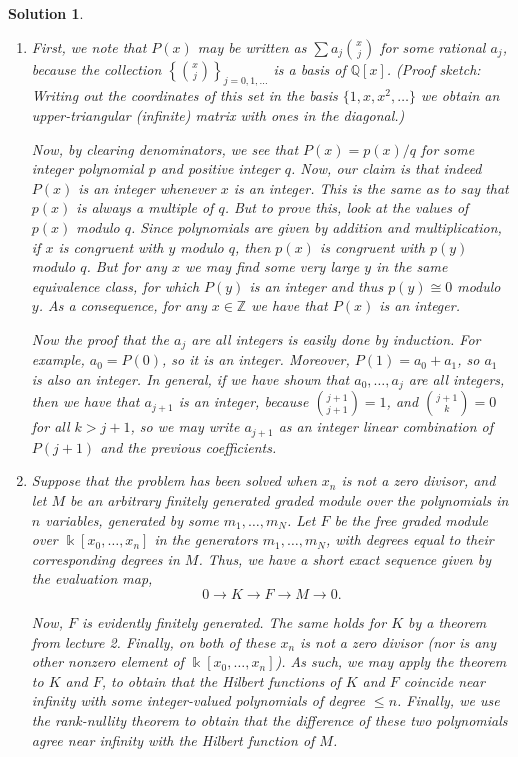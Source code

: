 \documentclass{article}
\theoremstyle{nonumberplain}
\newtheorem{sol}{Solution}
\newcommand{\Z}{\mathbb{Z}}
\newcommand{\Q}{\mathbb{Q}}
\newcommand{\kk}{\Bbbk}
\begin{document}
\begin{sol}
\begin{enumerate}
\item First, we note that $P(x)$ may be written as $\sum a_j \binom x j$ for some rational $a_j$, because the collection $\left\{\binom x j\right\}_{j = 0, 1, \dots}$ is a basis of $\Q[x]$. (Proof sketch: Writing out the coordinates of this set in the basis $\{1,x,x^2,\dots\}$ we obtain an upper-triangular (infinite) matrix with ones in the diagonal.)

Now, by clearing denominators, we see that $P(x) = p(x) / q$ for some integer polynomial $p$ and positive integer $q$. Now, our claim is that indeed $P(x)$ is an integer whenever $x$ is an integer. This is the same as to say that $p(x)$ is always a multiple of $q$. But to prove this, look at the values of $p(x)$ modulo $q$. Since polynomials are given by addition and multiplication, if $x$ is congruent with $y$ modulo $q$, then $p(x)$ is congruent with $p(y)$ modulo $q$. But for any $x$ we may find some very large $y$ in the same equivalence class, for which $P(y)$ is an integer and thus $p(y) \cong 0$ modulo $y$. As a consequence, \emph{for any $x \in \Z$} we have that $P(x)$ is an integer.

Now the proof that the $a_j$ are all integers is easily done by induction. For example, $a_0 = P(0)$, so it is an integer. Moreover, $P(1) = a_0 + a_1$, so $a_1$ is also an integer. In general, if we have shown that $a_0, \dots, a_j$ are all integers, then we have that $a_{j+1}$ is an integer, because $\binom{j+1}{j+1} = 1$, and $\binom{j+1}k = 0$ for all $k > j+1$, so we may write $a_{j+1}$ as an integer linear combination of $P(j+1)$ and the previous coefficients.

\item Suppose that the problem has been solved when $x_n$ is not a zero divisor, and let $M$ be an arbitrary finitely generated graded module over the polynomials in $n$ variables, generated by some $m_1, \dots, m_N$. Let $F$ be the free graded module over $\kk[x_0, \dots, x_n]$ in the generators $m_1, \dots, m_N$, with degrees equal to their corresponding degrees in $M$. Thus, we have a short exact sequence given by the evaluation map,
\begin{equation}
0 \to K \to F \to M \to 0.
\end{equation}

Now, $F$ is evidently finitely generated. The same holds for $K$ by a theorem from lecture 2. Finally, on both of these $x_n$ is not a zero divisor (nor is any other nonzero element of $\kk[x_0, \dots, x_n]$). As such, we may apply the theorem to $K$ and $F$, to obtain that the Hilbert functions of $K$ and $F$ coincide near infinity with some integer-valued polynomials of degree $\leq n$. Finally, we use the rank-nullity theorem to obtain that the difference of these two polynomials agree near infinity with the Hilbert function of $M$.


\end{enumerate}
\end{sol}
\end{document}
